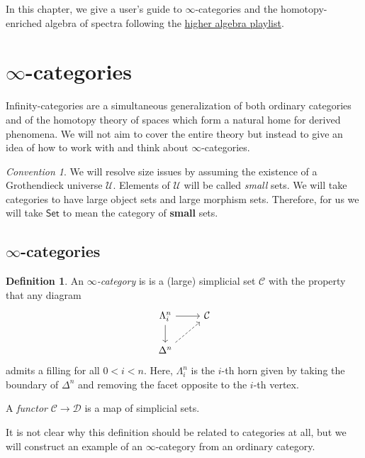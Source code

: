 \documentclass[10pt, oneside]{memoir}
\theoremstyle{definition}
\newtheorem{defn}[thm]{Definition}
\theoremstyle{remark}
\newtheorem{conv}[thm]{Convention}
\theoremstyle{plain}
\theoremstyle{definition}
\theoremstyle{remark}
\newcommand{\mc}[1]{\mathcal{#1}}
\newcommand{\ms}[1]{\mathsf{#1}}
\newcommand{\1}{\mathbf{1}}
\newcommand{\2}{\mathbf{2}}
\newcommand{\3}{\mathbf{3}}
\begin{document}
In this chapter, we give a user's guide to $\infty$-categories and the homotopy-enriched algebra of spectra following the \href{https://www.youtube.com/playlist?list=PLsmqTkj4MGTDenpj574aSvIRBROwCugoB}{higher algebra playlist}.

\section{\texorpdfstring{$\infty$-categories}{Infinity-categories}}%
\label{sec:Infinity-categories}

Infinity-categories are a simultaneous generalization of both ordinary categories and of the homotopy theory of spaces which form a natural home for derived phenomena. We will not aim to cover the entire theory but instead to give an idea of how to work with and think about $\infty$-categories.

\begin{conv}
    We will resolve size issues by assuming the existence of a Grothendieck universe $\mc{U}$. Elements of $\mc{U}$ will be called \textit{small} sets. We will take categories to have large object sets and large morphism sets. Therefore, for us we will take $\ms{Set}$ to mean the category of \textbf{small} sets.
\end{conv}

\subsection{\texorpdfstring{$\infty$-categories}{Infinity-categories}}%
\label{sub:infinity cats}

\begin{defn}
    An \textit{$\infty$-category} is is a (large) simplicial set $\mc{C}$ with the property that any diagram
    \begin{equation*}
    \begin{tikzcd}
        \Lambda_i^n \ar{r} \ar{d} & \mc{C} \\
        \Delta^n \ar[dashrightarrow]{ur}
    \end{tikzcd}
    \end{equation*}
    admits a filling for all $0 < i < n$. Here, $\Lambda_i^n$ is the $i$-th horn given by taking the boundary of $\Delta^n$ and removing the facet opposite to the $i$-th vertex.

    A \textit{functor} $\mc{C} \to \mc{D}$ is a map of simplicial sets.
\end{defn}

It is not clear why this definition should be related to categories at all, but we will construct an example of an $\infty$-category from an ordinary category.
\end{document}
